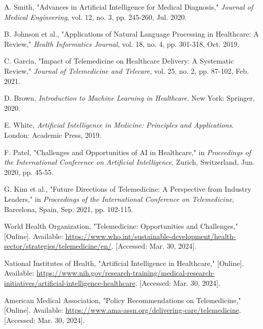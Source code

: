 \documentclass[conference]{IEEEtran}
\begin{document}
\begin{thebibliography}{9}
A. Smith, "Advances in Artificial Intelligence for Medical Diagnosis," \textit{Journal of Medical Engineering}, vol. 12, no. 3, pp. 245-260, Jul. 2020.

B. Johnson et al., "Applications of Natural Language Processing in Healthcare: A Review," \textit{Health Informatics Journal}, vol. 18, no. 4, pp. 301-318, Oct. 2019.

C. Garcia, "Impact of Telemedicine on Healthcare Delivery: A Systematic Review," \textit{Journal of Telemedicine and Telecare}, vol. 25, no. 2, pp. 87-102, Feb. 2021.

D. Brown, \textit{Introduction to Machine Learning in Healthcare}. New York: Springer, 2020.

E. White, \textit{Artificial Intelligence in Medicine: Principles and Applications}. London: Academic Press, 2019.

F. Patel, "Challenges and Opportunities of AI in Healthcare," in \textit{Proceedings of the International Conference on Artificial Intelligence}, Zurich, Switzerland, Jun. 2020, pp. 45-55.

G. Kim et al., "Future Directions of Telemedicine: A Perspective from Industry Leaders," in \textit{Proceedings of the International Conference on Telemedicine}, Barcelona, Spain, Sep. 2021, pp. 102-115.

World Health Organization, "Telemedicine: Opportunities and Challenges," [Online]. Available: \url{https://www.who.int/sustainable-development/health-sector/strategies/telemedicine/en/}. [Accessed: Mar. 30, 2024].

National Institutes of Health, "Artificial Intelligence in Healthcare," [Online]. Available: \url{https://www.nih.gov/research-training/medical-research-initiatives/artificial-intelligence-healthcare}. [Accessed: Mar. 30, 2024].

American Medical Association, "Policy Recommendations on Telemedicine," [Online]. Available: \url{https://www.ama-assn.org/delivering-care/telemedicine}. [Accessed: Mar. 30, 2024].
\end{thebibliography}
\end{document}
